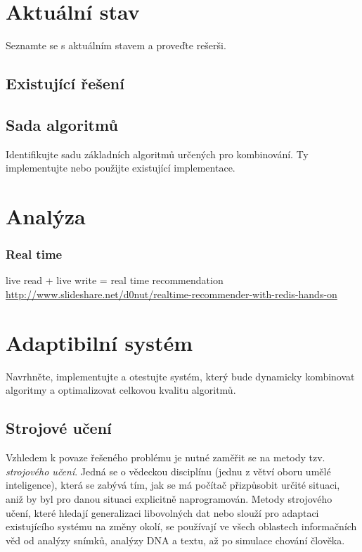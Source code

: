 \documentclass[thesis=M,czech]{FITthesis}[2014/05/07]
\begin{document}
	
\chapter{Aktuální stav}	
Seznamte se s aktuálním stavem a proveďte rešerši.

\section{Existující řešení}


\section{Sada algoritmů}
Identifikujte sadu základních algoritmů určených pro kombinování. Ty implementujte nebo použijte existující implementace.

\chapter{Analýza}
\label{chap:analysis}
	
	\subsection{Real time}
	live read + live write = real time recommendation
	\url{http://www.slideshare.net/d0nut/realtime-recommender-with-redis-hands-on}	
			
\chapter{Adaptibilní systém}
Navrhněte, implementujte a otestujte systém, který bude dynamicky kombinovat algoritmy a optimalizovat celkovou kvalitu algoritmů.
\label{chap:ensemble}

\section{Strojové učení}

Vzhledem k povaze řešeného problému je nutné zaměřit se na metody tzv. \emph{strojového učení}. 
Jedná se o vědeckou disciplínu (jednu z větví oboru umělé inteligence), která se zabývá tím, jak se má počítač přizpůsobit určité situaci, aniž by byl pro danou situaci explicitně naprogramován. Metody strojového učení, které hledají generalizaci libovolných dat nebo slouží pro adaptaci existujícího systému na změny okolí, se používají ve všech oblastech informačních věd od analýzy snímků, analýzy DNA a textu, až po simulace chování člověka. 
\end{document}
